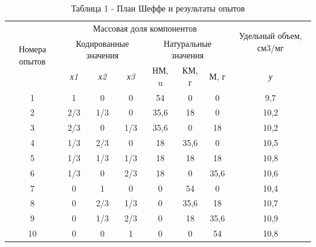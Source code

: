\begin{table}[H]
  \caption*{Таблица 1 - План Шеффе и результаты опытов}
  \centering
  \begin{tabular}{|c|c|c|c|c|c|c|c|}
  \hline
  \multirow{3}{*}{Номера опытов} &
    \multicolumn{6}{c|}{Массовая доля компонентов} &
    \multirow{2}{*}{Удельный объем, см3/мг} \\ \cline{2-7}
   & \multicolumn{3}{c|}{Кодированные значения} & \multicolumn{3}{c|}{Натуральные значения} &   \\ \cline{2-8} 
   & \textit{х1} & \textit{х2} & \textit{х3} & НМ, u & КМ, г & М, г & \textit{у} \\ \hline
  1 & 1 & 0 & 0 & 54 & 0 & 0 & 9,7 \\ \hline
  2 & 2/3 & 1/3 & 0 & 35,6 & 18 & 0 & 10,2 \\ \hline
  3 & 2/3 & 0 & 1/3 & 35,6 & 0 & 18 & 10,2 \\ \hline
  4 & 1/3 & 2/3 & 0 & 18 & 35,6 & 0 & 10,5 \\ \hline
  5 & 1/3 & 1/3 & 1/3 & 18 & 18 & 18 & 10,8 \\ \hline
  6 & 1/3 & 0 & 2/3 & 18 & 0 & 35,6 & 10,6 \\ \hline
  7 & 0 & 1 & 0 & 0 & 54 & 0 & 10,4 \\ \hline
  8 & 0 & 2/3 & 1/3 & 0 & 35,6 & 18 & 10,7 \\ \hline
  9 & 0 & 1/3 & 2/3 & 0 & 18 & 35,6 & 10,9 \\ \hline
  10 & 0 & 0 & 1 & 0 & 0 & 54 & 10,8 \\ \hline
  \end{tabular}
  \end{table}
  



